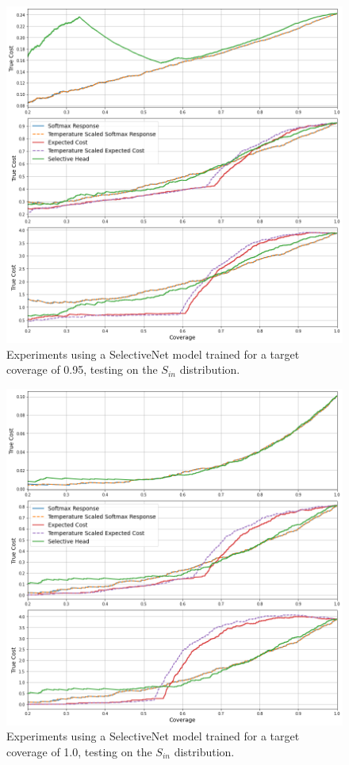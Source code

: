 \begin{figure}[H]
	\includegraphics[width=\textwidth]{images/binary/sn0.95_combine_distribution.png}
	\caption*{Experiments using a SelectiveNet model trained for a target coverage of 0.95, testing on the $S_{in}$ distribution.}
\end{figure}

\begin{figure}[H]
	\includegraphics[width=\textwidth]{images/binary/sn1.0_in_distribution.png}
	\caption*{Experiments using a SelectiveNet model trained for a target coverage of 1.0, testing on the $S_{in}$ distribution.}
\end{figure}

